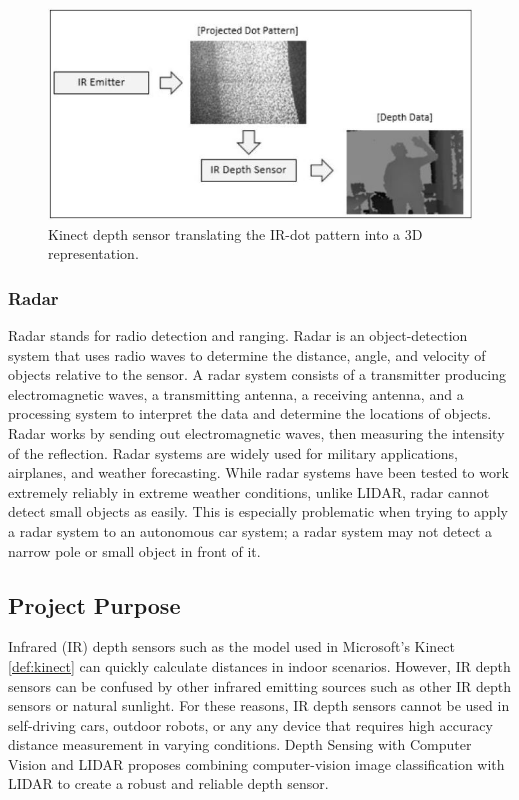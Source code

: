 \documentclass[onecolumn, draftclsnofoot,10pt, compsoc]{IEEEtran}
\makeatletter
\newcommand\captionof[1]{\def\@captype{#1}\caption}
\makeatother
\begin{document}
\begin{singlespace}
		\begin{figure}[H]
			\includegraphics[scale=0.5]{kinect_depth.jpg}
			\captionof{figure}{Kinect depth sensor translating the IR-dot pattern into a 3D representation. \cite{ibrahim_2018}}
			\label{kinect}
		\end{figure}

		\subsubsection{Radar}
			Radar stands for radio detection and ranging.
			Radar is an object-detection system that uses radio waves to determine the distance, angle, and velocity of objects relative to the sensor.
			A radar system consists of a transmitter producing electromagnetic waves, a transmitting antenna, a receiving antenna, and a processing system to interpret the data and determine the locations of objects.
			Radar works by sending out electromagnetic waves, then measuring the intensity of the reflection. 
			Radar systems are widely used for military applications, airplanes, and weather forecasting.
			While radar systems have been tested to work extremely reliably in extreme weather conditions, unlike LIDAR, radar cannot detect small objects as easily. 
			This is especially problematic when trying to apply a radar system to an autonomous car system; a radar system may not detect a narrow pole or small object in front of it. \cite{aus}


	\subsection{Project Purpose}
		Infrared (IR) depth sensors such as the model used in Microsoft's Kinect \ref{def:kinect} can quickly calculate distances in indoor scenarios.
		However, IR depth sensors can be confused by other infrared emitting sources such as other IR depth sensors or natural sunlight.
		For these reasons, IR depth sensors cannot be used in self-driving cars, outdoor robots, or any any device that requires high accuracy distance measurement in varying conditions.
		Depth Sensing with Computer Vision and LIDAR proposes combining computer-vision image classification with LIDAR to create a robust and reliable depth sensor.


\end{singlespace}
\end{document}
